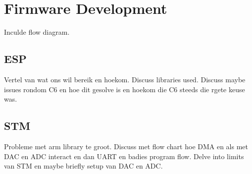 \section{Firmware Development}
Inculde flow diagram.

\subsection{ESP}
Vertel van wat ons wil bereik en hoekom. Discuss libraries used. Discuss maybe issues rondom C6 en hoe dit gesolve is en hoekom die C6 steeds die rgete keuse was.

\subsection{STM}
Probleme met arm library te groot. Discuss met flow chart hoe DMA en als met DAC en ADC interact en dan UART en badies program flow. Delve into limits van STM en maybe briefly setup van DAC en ADC.

\label{chap:design}